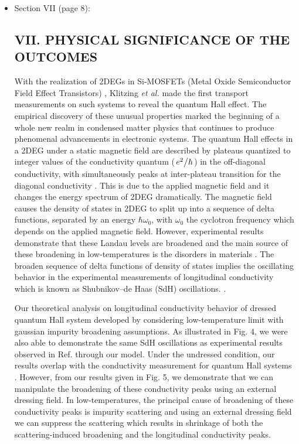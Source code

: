 \documentclass{article}
\begin{document}
\begin{itemize}
  \item Section VII (page 8):\\
  {\color{Maroon}
  \subsection*{VII. PHYSICAL SIGNIFICANCE OF THE OUTCOMES}

  With the realization of 2DEGs in Si-MOSFETs (Metal Oxide Semiconductor Field Effect Transistors) \cite{fowler66}, Klitzing \textit{et al.} \cite{klitzing80} made the first transport measurements on such systems to reveal the quantum Hall effect. The empirical discovery of these unusual properties marked the beginning of a whole new realm in condensed matter physics that continues to produce phenomenal advancements in electronic systems. The quantum Hall effects in a 2DEG under a static magnetic field are described by plateaus quantized to integer values of the conductivity quantum ($\flatfrac{e^2}{\hbar}$) in the off-diagonal conductivity, with simultaneously peaks at inter-plateau transition for the diagonal conductivity \cite{endo09}. This is due to the applied magnetic field and it changes the energy spectrum of 2DEG dramatically. The magnetic field causes the density of states in 2DEG to split up into a sequence of delta functions, separated by an energy $\hbar\omega_0$, with $\omega_0$ the cyclotron frequency which depends on the applied magnetic field.
  However, experimental results demonstrate that these Landau levels are broadened and the main source of these broadening in low-temperatures is the disorders in materials \cite{ando85,dial07}. The broaden sequence of delta functions of density of states implies the oscillating behavior in the experimental measurements of longitudinal conductivity which is known as Shubnikov–de Haas (SdH) oscillations. \cite{endo09,wakabayashi78}.

  Our theoretical analysis on longitudinal conductivity behavior of dressed quantum Hall system developed by considering low-temperature limit with gaussian impurity broadening assumptions. As illustrated in Fig. 4, we were also able to demonstrate the same SdH oscillations as experimental results observed in Ref.\cite{endo09,wakabayashi78} through our model. Under the undressed condition, our results overlap with the conductivity measurement for quantum Hall systems \cite{endo09}. However, from our results given in Fig. 5, we demonstrate that we can manipulate the broadening of these conductivity peaks using an external dressing field. In low-temperatures, the principal cause of broadening of these conductivity peaks is impurity scattering and using an external dressing field we can suppress the scattering which results in shrinkage of both the scattering-induced broadening and the longitudinal conductivity peaks.

}
\end{itemize}
\end{document}
